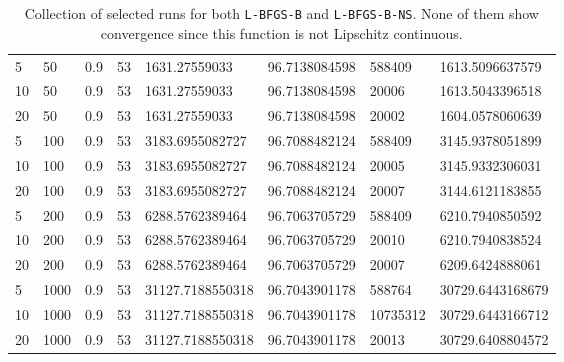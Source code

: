 \begin{table}
\begin{center}
\begin{tabular}{|l|l|l|l|l|l|l|l|}
      5 & 50 & 0.9 & 53 & 1631.27559033 & 96.7138084598 & 588409 & 1613.5096637579\\
      10 & 50 & 0.9 & 53 & 1631.27559033 & 96.7138084598 & 20006 & 1613.5043396518\\
      20 & 50 & 0.9 & 53 & 1631.27559033 & 96.7138084598 & 20002 & 1604.0578060639\\
      5 & 100 & 0.9 & 53 & 3183.6955082727 & 96.7088482124 & 588409 & 3145.9378051899\\
      10 & 100 & 0.9 & 53 & 3183.6955082727 & 96.7088482124 & 20005 & 3145.9332306031\\
      20 & 100 & 0.9 & 53 & 3183.6955082727 & 96.7088482124 & 20007 & 3144.6121183855\\
      5 & 200 & 0.9 & 53 & 6288.5762389464 & 96.7063705729 & 588409 & 6210.7940850592\\
      10 & 200 & 0.9 & 53 & 6288.5762389464 & 96.7063705729 & 20010 & 6210.7940838524\\
      20 & 200 & 0.9 & 53 & 6288.5762389464 & 96.7063705729 & 20007 & 6209.6424888061\\
      5 & 1000 & 0.9 & 53 & 31127.7188550318 & 96.7043901178 & 588764 & 30729.6443168679\\
      10 & 1000 & 0.9 & 53 & 31127.7188550318 & 96.7043901178 & 10735312 & 30729.6443166712\\
      20 & 1000 & 0.9 & 53 & 31127.7188550318 & 96.7043901178 & 20013 & 30729.6408804572\\
      \hline
    \end{tabular}
    \caption[Selected Runs $p = 0.9$]{Collection of selected runs for both \texttt{L-BFGS-B} and \texttt{L-BFGS-B-NS}. None of them show convergence since this function is not Lipschitz continuous.}
    \label{p09}
  \end{center}
\end{table}
\pagebreak
\pagebreak
\clearpage
